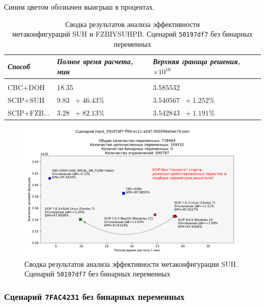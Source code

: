 \documentclass[%
	11pt,
	a4paper,
	utf8,
		]{article}
\begin{document}
Синим цветом обозначен выигрыш в процентах.

{
	\begin{table}[!h]
		\centering
		\caption{Сводка результатов анализа эффективности \\метаконфигураций SUH и FZBIVSUHPB. Сценарий \texttt{50197df7} без бинарных переменных}
		\begin{tabular}{ p{2.5cm} p{3.3cm} p{3.4cm} }
			\emph{Способ} & \emph{Полное время расчета, мин} & \emph{Верхняя граница решения, $ \times 10^{10} $} \\
			\hline\hline\\[-3.5mm]
			{CBC+DOH} & 18.35 & $ 3.585532 $ \\
			\hline
			SCIP+SUH & 9.83 {\color{blue} $\ +46.43 $\%} & $ 3.540567 $ {\color{blue} $\ +1.252 $\%} \\
			\hline
			SCIP+FZB... & 3.28 {\color{blue} $\ +82.13 $\%} & $ 3.542843 $ {\color{blue} $\ +1.191 $\%} \\
		\end{tabular}\label{tab:50197df7_wo_bins}
	\end{table}
}

\begin{figure}[!h]
	\centering
	\includegraphics[scale=0.6]{figures/summary_50197df7.pdf}
	\caption{Сводка результатов анализа эффективности метаконфигурации SUH. \\Сценарий \texttt{50197df7} без бинарных переменных}\label{fig:summary_50197df7}
\end{figure}

\subsubsection{Сценарий \texttt{7FAC4231} без бинарных переменных}
\end{document}
